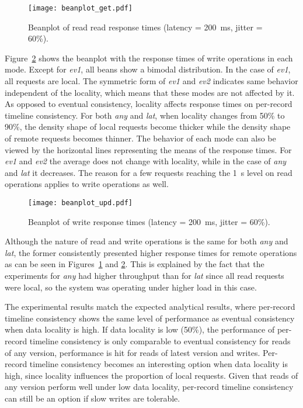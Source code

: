 \documentclass[man,floatsintext,12pt]{apa6}
\begin{document}
\begin{figure}[h!]
\caption{Beanplot of read read response times (latency = 200~ms, jitter = 60\%).}
\texttt{[image: beanplot\_get.pdf]}
\label{fig:beanplot_get}
\end{figure}

Figure~\ref{fig:beanplot_upd} shows the beanplot with the response times of
write operations in each mode. Except for \textit{ev1}, all beans show a
bimodal distribution. In the case of \textit{ev1}, all requests are local. The
symmetric form of \textit{ev1} and \textit{ev2} indicates same behavior
independent of the locality, which means that these modes are not affected by
it. As opposed to eventual consistency, locality affects response times on
per-record timeline consistency. For both \textit{any} and \textit{lat}, when
locality changes from 50\% to 90\%, the density shape of local requests become
thicker while the density shape of remote requests becomes thinner. The
behavior of each mode can also be viewed by the horizontal lines representing
the means of the response times. For \textit{ev1} and \textit{ev2} the average
does not change with locality, while in the case of \textit{any} and
\textit{lat} it decreases. The reason for a few requests reaching the 1~s level
on read operations applies to write operations as well.

\begin{figure}[h!]
\caption{Beanplot of write response times (latency = 200~ms, jitter = 60\%).}
\texttt{[image: beanplot\_upd.pdf]}
\label{fig:beanplot_upd}
\end{figure}

Although the nature of read and write operations is the same for both
\textit{any} and \textit{lat}, the former consistently presented higher
response times for remote operations as can be seen in
Figures~\ref{fig:beanplot_get} and \ref{fig:beanplot_upd}. This is explained by
the fact that the experiments for \textit{any} had higher throughput than for
\textit{lat} since all read requests were local, so the system was operating
under higher load in this case.

The experimental results match the expected analytical results, where
per-record timeline consistency shows the same level of performance as eventual
consistency when data locality is high. If data locality
is low (50\%), the performance of per-record timeline consistency is only
comparable to eventual consistency for reads of any version, performance is hit
for reads of latest version and writes. Per-record timeline consistency
becomes an interesting option when data locality is high, since locality
influences the proportion of local requests. Given that reads of any version
perform well under low data locality, per-record timeline consistency can still
be an option if slow writes are tolerable.
\end{document}
